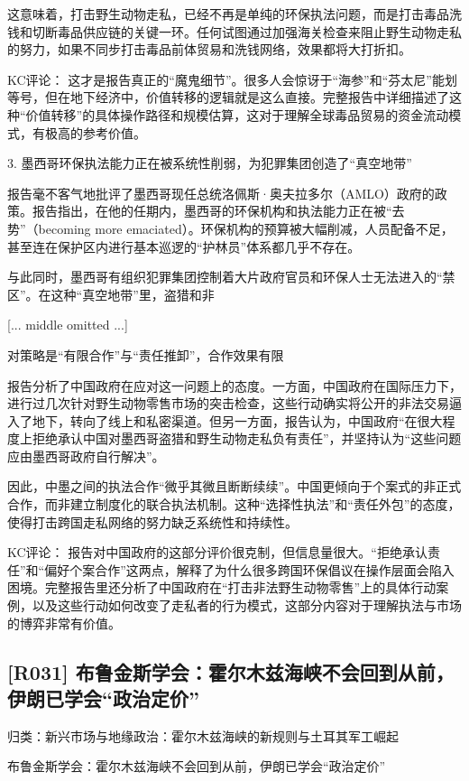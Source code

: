\documentclass[11pt]{ctexart}
\begin{document}
这意味着，打击野生动物走私，已经不再是单纯的环保执法问题，而是打击毒品洗钱和切断毒品供应链的关键一环。任何试图通过加强海关检查来阻止野生动物走私的努力，如果不同步打击毒品前体贸易和洗钱网络，效果都将大打折扣。

KC评论： 这才是报告真正的“魔鬼细节”。很多人会惊讶于“海参”和“芬太尼”能划等号，但在地下经济中，价值转移的逻辑就是这么直接。完整报告中详细描述了这种“价值转移”的具体操作路径和规模估算，这对于理解全球毒品贸易的资金流动模式，有极高的参考价值。

3. 墨西哥环保执法能力正在被系统性削弱，为犯罪集团创造了“真空地带”

报告毫不客气地批评了墨西哥现任总统洛佩斯·奥夫拉多尔（AMLO）政府的政策。报告指出，在他的任期内，墨西哥的环保机构和执法能力正在被“去势”（becoming more emaciated）。环保机构的预算被大幅削减，人员配备不足，甚至连在保护区内进行基本巡逻的“护林员”体系都几乎不存在。

与此同时，墨西哥有组织犯罪集团控制着大片政府官员和环保人士无法进入的“禁区”。在这种“真空地带”里，盗猎和非

[... middle omitted ...]

对策略是“有限合作”与“责任推卸”，合作效果有限

报告分析了中国政府在应对这一问题上的态度。一方面，中国政府在国际压力下，进行过几次针对野生动物零售市场的突击检查，这些行动确实将公开的非法交易逼入了地下，转向了线上和私密渠道。但另一方面，报告认为，中国政府“在很大程度上拒绝承认中国对墨西哥盗猎和野生动物走私负有责任”，并坚持认为“这些问题应由墨西哥政府自行解决”。

因此，中墨之间的执法合作“微乎其微且断断续续”。中国更倾向于个案式的非正式合作，而非建立制度化的联合执法机制。这种“选择性执法”和“责任外包”的态度，使得打击跨国走私网络的努力缺乏系统性和持续性。

KC评论： 报告对中国政府的这部分评价很克制，但信息量很大。“拒绝承认责任”和“偏好个案合作”这两点，解释了为什么很多跨国环保倡议在操作层面会陷入困境。完整报告里还分析了中国政府在“打击非法野生动物零售”上的具体行动案例，以及这些行动如何改变了走私者的行为模式，这部分内容对于理解执法与市场的博弈非常有价值。

\subsection{[R031] 布鲁金斯学会：霍尔木兹海峡不会回到从前，伊朗已学会“政治定价”}
{\small\color{refgray}归类：新兴市场与地缘政治：霍尔木兹海峡的新规则与土耳其军工崛起}

布鲁金斯学会：霍尔木兹海峡不会回到从前，伊朗已学会“政治定价”
\end{document}
